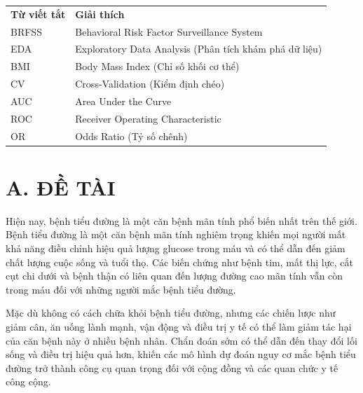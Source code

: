 \documentclass{article}
\begin{document}
\noindent
\begin{tabularx}{\textwidth}{ l X }
    \hspace{1cm} \textbf{Từ viết tắt} & \textbf{Giải thích}                                    \\
    \hspace{1cm} BRFSS                & Behavioral Risk Factor Surveillance System             \\
    \hspace{1cm} EDA                  & Exploratory Data Analysis (Phân tích khám phá dữ liệu) \\
    \hspace{1cm} BMI                  & Body Mass Index (Chỉ số khối cơ thể)                   \\
    \hspace{1cm} CV                   & Cross-Validation (Kiểm định chéo)                      \\
    \hspace{1cm} AUC                  & Area Under the Curve                                   \\
    \hspace{1cm} ROC                  & Receiver Operating Characteristic                      \\
    \hspace{1cm} OR                   & Odds Ratio (Tỷ số chênh)                               \\
\end{tabularx}

\newpage
{}

\section{A. ĐỀ TÀI}

Hiện nay, bệnh tiểu đường là một căn bệnh mãn tính phổ biến nhất trên thế giới. Bệnh tiểu đường là một căn bệnh mãn tính nghiêm trọng khiến mọi người mất khả năng điều chỉnh hiệu quả lượng glucose trong máu và có thể dẫn đến giảm chất lượng cuộc sống và tuổi thọ. Các biến chứng như bệnh tim, mất thị lực, cắt cụt chi dưới và bệnh thận có liên quan đến lượng đường cao mãn tính vẫn còn trong máu đối với những người mắc bệnh tiểu đường.

Mặc dù không có cách chữa khỏi bệnh tiểu đường, nhưng các chiến lược như giảm cân, ăn uống lành mạnh, vận động và điều trị y tế có thể làm giảm tác hại của căn bệnh này ở nhiều bệnh nhân. Chẩn đoán sớm có thể dẫn đến thay đổi lối sống và điều trị hiệu quả hơn, khiến các mô hình dự đoán nguy cơ mắc bệnh tiểu đường trở thành công cụ quan trọng đối với cộng đồng và các quan chức y tế công cộng.
\end{document}
